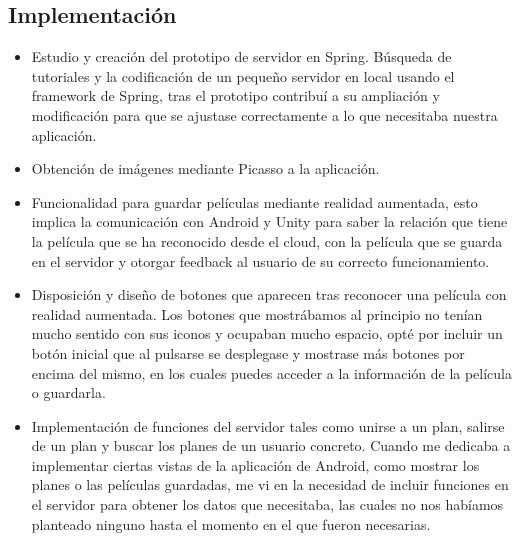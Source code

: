     \subsection{Implementación}
    \label{makereference7.1.3}
        \begin{itemize}
            \item Estudio y creación del prototipo de servidor en Spring. Búsqueda de tutoriales y la codificación de un pequeño servidor en local usando el framework de Spring, tras el prototipo contribuí a su ampliación y modificación para que se ajustase correctamente a lo que necesitaba nuestra aplicación.
            \item Obtención de imágenes mediante Picasso a la aplicación. 
            \item Funcionalidad para guardar películas mediante realidad aumentada, esto implica la comunicación con Android y Unity para saber la relación que tiene la película que se ha reconocido desde el cloud, con la película que se guarda en el servidor y otorgar feedback al usuario de su correcto funcionamiento.
            \item Disposición y diseño de botones que aparecen tras reconocer una
            película con realidad aumentada. Los botones que mostrábamos al principio no tenían mucho sentido con sus iconos y ocupaban mucho espacio, opté por incluir un botón inicial que al pulsarse se desplegase y mostrase más botones por encima del mismo, en los cuales puedes acceder a la información de la película o guardarla.
            \item Implementación de funciones del servidor tales como unirse a un plan, salirse de un plan y buscar los planes de un usuario concreto. Cuando me dedicaba a implementar ciertas vistas de la aplicación de Android, como mostrar los planes o las películas guardadas, me vi en la necesidad de incluir funciones en el servidor para obtener los datos que necesitaba, las cuales no nos habíamos planteado ninguno hasta el momento en el que fueron necesarias. 
        \end{itemize}
